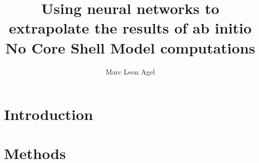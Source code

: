 



\title{Using neural networks to extrapolate the results of
  ab initio No Core Shell Model computations}
\author{Marc Leon Agel}


\submissiondate{\today}
\examdate{\today}

\maketitle

\affidavit

\tableofcontents
\chapter{Introduction}




\chapter{Methods}




